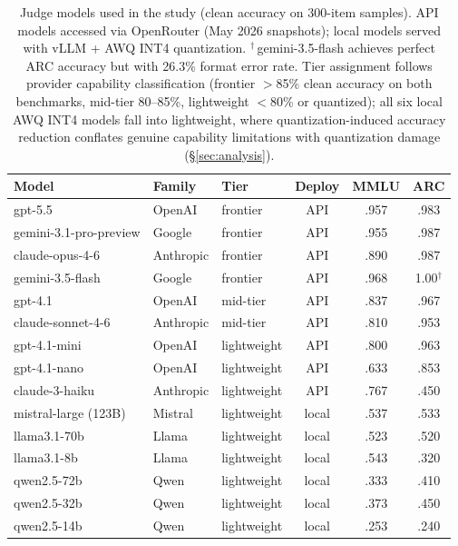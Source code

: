 \begin{table}[t]
\centering
\small
\begin{tabular}{lllccc}
\toprule
\textbf{Model} & \textbf{Family} & \textbf{Tier} & \textbf{Deploy} & \textbf{MMLU} & \textbf{ARC} \\
\midrule
gpt-5.5              & OpenAI    & frontier    & API   & .957 & .983 \\
gemini-3.1-pro-preview & Google  & frontier    & API   & .955 & .987 \\
claude-opus-4-6       & Anthropic & frontier   & API   & .890 & .987 \\
gemini-3.5-flash      & Google    & frontier   & API   & .968 & 1.00$^\dagger$ \\
\addlinespace
gpt-4.1               & OpenAI    & mid-tier   & API   & .837 & .967 \\
claude-sonnet-4-6     & Anthropic & mid-tier   & API   & .810 & .953 \\
\addlinespace
gpt-4.1-mini          & OpenAI    & lightweight & API  & .800 & .963 \\
gpt-4.1-nano          & OpenAI    & lightweight & API  & .633 & .853 \\
claude-3-haiku        & Anthropic & lightweight & API  & .767 & .450 \\
mistral-large (123B)  & Mistral   & lightweight & local & .537 & .533 \\
llama3.1-70b          & Llama     & lightweight & local & .523 & .520 \\
llama3.1-8b           & Llama     & lightweight & local & .543 & .320 \\
qwen2.5-72b           & Qwen      & lightweight & local & .333 & .410 \\
qwen2.5-32b           & Qwen      & lightweight & local & .373 & .450 \\
qwen2.5-14b           & Qwen      & lightweight & local & .253 & .240 \\
\bottomrule
\end{tabular}
\caption{Judge models used in the study (clean accuracy on 300-item samples). API models accessed via OpenRouter (May 2026 snapshots); local models served with vLLM + AWQ INT4 quantization. $^\dagger$\,gemini-3.5-flash achieves perfect ARC accuracy but with 26.3\% format error rate. Tier assignment follows provider capability classification (frontier $>$85\% clean accuracy on both benchmarks, mid-tier 80--85\%, lightweight $<$80\% or quantized); all six local AWQ INT4 models fall into lightweight, where quantization-induced accuracy reduction conflates genuine capability limitations with quantization damage (\S\ref{sec:analysis}).}
\label{tab:models}
\end{table}

